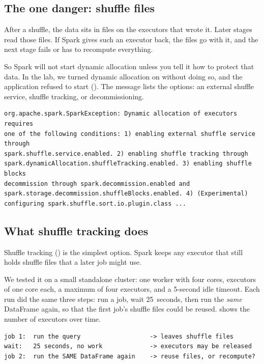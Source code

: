 \subsection*{The one danger: shuffle files}

After a shuffle, the data sits in files on the executors that wrote it. Later stages
read those files. If Spark gives such an executor back, the files go with it, and the
next stage fails or has to recompute everything.

So Spark will not start dynamic allocation unless you tell it how to protect that
data. In the lab, we turned dynamic allocation on without doing so, and the
application refused to start (). The message lists the
options: an external shuffle service, shuffle tracking, or decommissioning.

\begin{lstlisting}[language=text,style=plan,caption={Dynamic allocation without a plan for shuffle data (Spark 3.5.2, standalone cluster)},captionpos=b,label=lst:tuning-da-error]
org.apache.spark.SparkException: Dynamic allocation of executors requires
one of the following conditions: 1) enabling external shuffle service through
spark.shuffle.service.enabled. 2) enabling shuffle tracking through
spark.dynamicAllocation.shuffleTracking.enabled. 3) enabling shuffle blocks
decommission through spark.decommission.enabled and
spark.storage.decommission.shuffleBlocks.enabled. 4) (Experimental)
configuring spark.shuffle.sort.io.plugin.class ...
\end{lstlisting}

\subsection*{What shuffle tracking does}

Shuffle tracking () is the
simplest option. Spark keeps any executor that still holds shuffle files that a
later job might use.

We tested it on a small standalone cluster: one worker with four cores, executors
of one core each, a maximum of four executors, and a 5-second idle timeout. Each run
did the same three steps: run a job, wait 25~seconds, then run the \emph{same}
DataFrame again, so that the first job's shuffle files could be reused.
 shows the number of executors over time.

\begin{lstlisting}[language=text,style=plan,caption={The shape of the dynamic-allocation test},captionpos=b,label=lst:tuning-da-steps]
job 1:  run the query                   -> leaves shuffle files
wait:   25 seconds, no work             -> executors may be released
job 2:  run the SAME DataFrame again    -> reuse files, or recompute?
\end{lstlisting}

